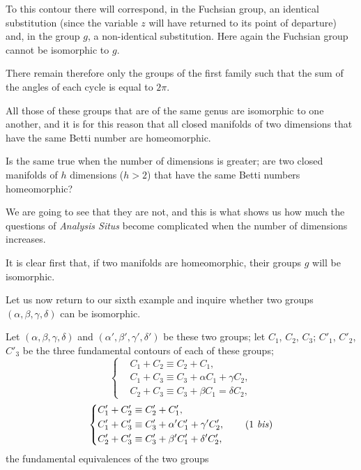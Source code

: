 \documentclass{article}
\begin{document}
To this contour there will correspond, in the Fuchsian group, an identical substitution (since the variable $z$ will have returned to its point of departure) and, in the group $g$, a non-identical substitution. Here again the Fuchsian group cannot be isomorphic to $g$.

There remain therefore only the groups of the first family such that the sum of the angles of each cycle is equal to $2\pi$.

All those of these groups that are of the same genus are isomorphic to one another, and it is for this reason that all closed manifolds of two dimensions that have the same Betti number are homeomorphic.

Is the same true when the number of dimensions is greater; are two closed manifolds of $h$ dimensions ($h > 2$) that have the same Betti numbers homeomorphic?

We are going to see that they are not, and this is what shows us how much the questions of \emph{Analysis Situs} become complicated when the number of dimensions increases.

It is clear first that, if two manifolds are homeomorphic, their groups $g$ will be isomorphic.

Let us now return to our sixth example and inquire whether two groups $(\alpha, \beta, \gamma, \delta)$ can be isomorphic.

Let $(\alpha, \beta, \gamma, \delta)$ and $(\alpha', \beta', \gamma', \delta')$ be these two groups; let $C_{1}$, $C_{2}$, $C_{3}$; $C'_{1}$, $C'_{2}$, $C'_{3}$ be the three fundamental contours of each of these groups;
\[ \left\{ \begin{aligned} &C_{1} + C_{2} \equiv C_{2} + C_{1},\\ &C_{1} + C_{3} \equiv C_{3} + \alpha C_{1} + \gamma C_{2},\\ &C_{2} + C_{3} \equiv C_{3} + \beta C_{1} = \delta C_{2}, \end{aligned} \right. \tag{1} \]
\[ \left\{ \begin{aligned} &C'_{1} + C'_{2} \equiv C'_{2} + C'_{1},\\ &C'_{1} + C'_{3} \equiv C'_{3} + \alpha' C'_{1} + \gamma' C'_{2},\\ &C'_{2} + C'_{3} \equiv C'_{3} + \beta' C'_{1} + \delta' C'_{2}, \end{aligned} \right. \tag{1 \textit{bis}} \]
the fundamental equivalences of the two groups
\end{document}
